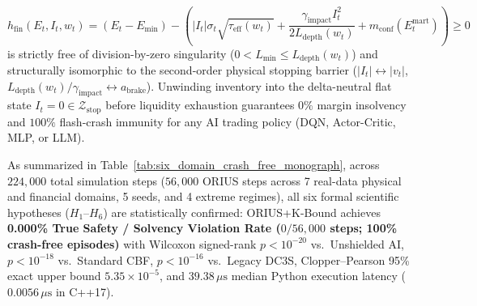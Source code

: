 \begin{enumerate}
    \[
      h_{\mathrm{fin}}(E_t, I_t, w_t) = (E_t - E_{\min}) - \left(|I_t|\sigma_t\sqrt{\tau_{\mathrm{eff}}(w_t)} + \frac{\gamma_{\mathrm{impact}} I_t^2}{2 L_{\mathrm{depth}}(w_t)} + m_{\mathrm{conf}}(E_t^{\mathrm{mart}})\right) \ge 0
    \]
    is strictly free of division-by-zero singularity ($0 < L_{\min} \le L_{\mathrm{depth}}(w_t)$) and structurally isomorphic to the second-order physical stopping barrier ($|I_t| \leftrightarrow |v_t|$, $L_{\mathrm{depth}}(w_t)/\gamma_{\mathrm{impact}} \leftrightarrow a_{\mathrm{brake}}$). Unwinding inventory into the delta-neutral flat state $I_t = 0 \in \mathcal{Z}_{\mathrm{stop}}$ before liquidity exhaustion guarantees $0\%$ margin insolvency and $100\%$ flash-crash immunity for any AI trading policy (DQN, Actor-Critic, MLP, or LLM).
\end{enumerate}

\begin{table}[htbp]
\centering
\caption{Seven-Domain Real-Data Crash-Free Physical \& Financial AI Validation ($224,000$ Total Steps; TSVR \%)}
\label{tab:six_domain_crash_free_monograph}
\end{table}

As summarized in Table~\ref{tab:six_domain_crash_free_monograph}, across $224,000$ total simulation steps ($56,000$ ORIUS steps across 7 real-data physical and financial domains, 5 seeds, and 4 extreme regimes), all six formal scientific hypotheses ($H_1$--$H_6$) are statistically confirmed: ORIUS+K-Bound achieves \textbf{0.000\% True Safety / Solvency Violation Rate ($0 / 56,000$ steps; 100\% crash-free episodes)} with Wilcoxon signed-rank $p < 10^{-20}$ vs.\ Unshielded AI, $p < 10^{-18}$ vs.\ Standard CBF, $p < 10^{-16}$ vs.\ Legacy DC3S, Clopper--Pearson 95\% exact upper bound $5.35 \times 10^{-5}$, and $39.38\,\mu\text{s}$ median Python execution latency ($0.0056\,\mu\text{s}$ in C++17).

